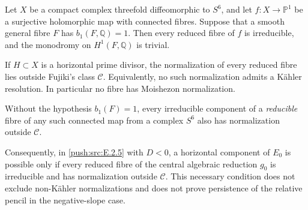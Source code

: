 
\begin{proposition}\hypertarget{tag-033G}{}\label{push:src:E.2.8}


Let $X$ be a compact complex threefold diffeomorphic to $S^6$, and
let $f:X\to\mathbb P^1$ be a surjective holomorphic map with
connected fibres.  Suppose that a smooth general fibre $F$ has
$b_1(F,\mathbb Q)=1$.  Then every reduced fibre of $f$ is
irreducible, and the monodromy on $H^1(F,\mathbb Q)$ is trivial.

If $H\subset X$ is a horizontal prime divisor, the normalization
of every reduced fibre lies outside Fujiki's class $\mathcal C$.
Equivalently, no such normalization admits a K\"ahler resolution.
In particular no fibre has Moishezon normalization.

Without the hypothesis $b_1(F)=1$, every irreducible component
of a \emph{reducible} fibre of any such connected map from a
complex $S^6$ also has normalization outside $\mathcal C$.

Consequently, in \ref{push:src:E.2.5} with $D<0$, a horizontal component of
$E_0$ is possible only if every reduced fibre of the central
algebraic reduction $g_0$ is irreducible and has normalization
outside $\mathcal C$.  This necessary condition does not exclude
non-K\"ahler normalizations and does not prove persistence of the
relative pencil in the negative-slope case.
\end{proposition}

